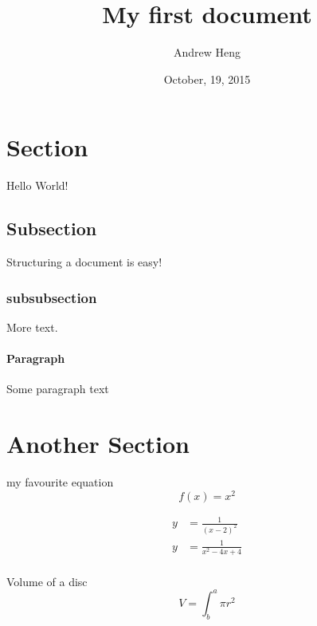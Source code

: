 \documentclass{article}
\title{My first document}
\date{October, 19, 2015}
\author{Andrew Heng}
\begin{document}
	\maketitle
	\newpage

\tableofcontents
\newpage

\section{Section} %
Hello World!
\subsection{Subsection} %
Structuring a document is easy!
\subsubsection{subsubsection}
More text.
\paragraph{Paragraph}
Some paragraph text
\section{Another Section}
my favourite equation\\
\begin{equation*}
f(x) = x^2
\end{equation*}

\begin{align} %
y &= \frac{1}{(x-2)^2}\\
y &= \frac{1}{x^2-4x+4}\\
\end{align}

Volume of a disc
\begin{equation}
V = \int^a_b  \pi r^2
\end{equation}


\newpage
\end{document}
